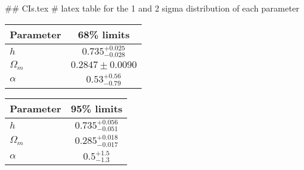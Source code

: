 ## CIs.tex
# latex table for the 1 and 2 sigma distribution of each parameter

\begin{tabular} { l  c}
 Parameter &  68\% limits\\
\hline
{\boldmath$h              $} & $0.735^{+0.025}_{-0.028}   $\\
{\boldmath$\Omega_m       $} & $0.2847\pm 0.0090          $\\
{\boldmath$\alpha         $} & $0.53^{+0.56}_{-0.79}      $\\
\hline
\end{tabular}

\begin{tabular} { l  c}
 Parameter &  95\% limits\\
\hline
{\boldmath$h              $} & $0.735^{+0.056}_{-0.051}   $\\
{\boldmath$\Omega_m       $} & $0.285^{+0.018}_{-0.017}   $\\
{\boldmath$\alpha         $} & $0.5^{+1.5}_{-1.3}         $\\
\hline
\end{tabular}
